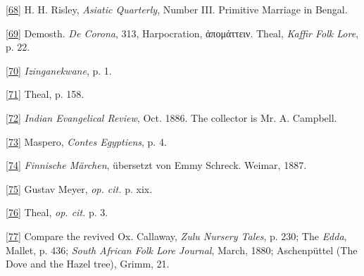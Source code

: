 \documentclass[14pt,a4paper]{memoir}
\begin{document}
\protect\hypertarget{4533318093929944247_33931-h-1.htm.xhtmlux5cux23Footnote_68}{}{}\protect\hyperlink{4533318093929944247_33931-h-1.htm.xhtmlux5cux23FNanchor_68}{{{[}68{]}}}
H. H. Risley, \emph{Asiatic Quarterly}, Number III.
\textquotesingle Primitive Marriage in Bengal.\textquotesingle{}

\protect\hypertarget{4533318093929944247_33931-h-1.htm.xhtmlux5cux23Footnote_69}{}{}\protect\hyperlink{4533318093929944247_33931-h-1.htm.xhtmlux5cux23FNanchor_69}{{{[}69{]}}}
Demosth. \emph{De Corona}, 313, Harpocration, ἀπομάττειν. Theal,
\emph{Kaffir Folk Lore}, p. 22.

\protect\hypertarget{4533318093929944247_33931-h-1.htm.xhtmlux5cux23Footnote_70}{}{}\protect\hyperlink{4533318093929944247_33931-h-1.htm.xhtmlux5cux23FNanchor_70}{{{[}70{]}}}
\emph{Izinganekwane}, p. 1.

\protect\hypertarget{4533318093929944247_33931-h-1.htm.xhtmlux5cux23Footnote_71}{}{}\protect\hyperlink{4533318093929944247_33931-h-1.htm.xhtmlux5cux23FNanchor_71}{{{[}71{]}}}
Theal, p. 158.

\protect\hypertarget{4533318093929944247_33931-h-1.htm.xhtmlux5cux23Footnote_72}{}{}\protect\hyperlink{4533318093929944247_33931-h-1.htm.xhtmlux5cux23FNanchor_72}{{{[}72{]}}}
\emph{Indian Evangelical Review}, Oct. 1886. The collector is Mr. A.
Campbell.

\protect\hypertarget{4533318093929944247_33931-h-1.htm.xhtmlux5cux23Footnote_73}{}{}\protect\hyperlink{4533318093929944247_33931-h-1.htm.xhtmlux5cux23FNanchor_73}{{{[}73{]}}}
Maspero, \emph{Contes Egyptiens}, p. 4.

\protect\hypertarget{4533318093929944247_33931-h-1.htm.xhtmlux5cux23Footnote_74}{}{}\protect\hyperlink{4533318093929944247_33931-h-1.htm.xhtmlux5cux23FNanchor_74}{{{[}74{]}}}
\emph{Finnische Märchen}, übersetzt von Emmy Schreck. Weimar, 1887.

\protect\hypertarget{4533318093929944247_33931-h-1.htm.xhtmlux5cux23Footnote_75}{}{}\protect\hyperlink{4533318093929944247_33931-h-1.htm.xhtmlux5cux23FNanchor_75}{{{[}75{]}}}
Gustav Meyer, \emph{op. cit.} p. xix.

\protect\hypertarget{4533318093929944247_33931-h-1.htm.xhtmlux5cux23Footnote_76}{}{}\protect\hyperlink{4533318093929944247_33931-h-1.htm.xhtmlux5cux23FNanchor_76}{{{[}76{]}}}
Theal, \emph{op. cit.} p. 3.

\protect\hypertarget{4533318093929944247_33931-h-1.htm.xhtmlux5cux23Footnote_77}{}{}\protect\hyperlink{4533318093929944247_33931-h-1.htm.xhtmlux5cux23FNanchor_77}{{{[}77{]}}}
Compare the revived Ox. Callaway, \emph{Zulu Nursery Tales}, p. 230; The
\emph{Edda}, Mallet, p. 436; \emph{South African Folk Lore Journal},
March, 1880; Aschenpüttel (The Dove and the Hazel tree), Grimm, 21.
\end{document}
